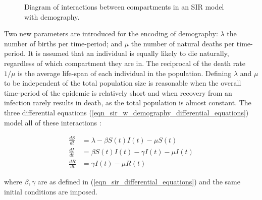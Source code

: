 \documentclass[11pt,a4paper]{article}
\theoremstyle{break}
\begin{document}
  \begin{figure}[H]
    \centering
    \caption{Diagram of interactions between compartments in an SIR model with demography.}
    \label{fig_sir_model_diagram_w_demography}
  \end{figure}

  \par Two new parameters are introduced for the encoding of demography: $\lambda$ the number of births per time-period; and $\mu$ the number of natural deaths per time-period. It is assumed that an individual is equally likely to die naturally, regardless of which compartment they are in. The reciprocal of the death rate $1/\mu$ is the average life-span of each individual in the population. Defining $\lambda$ and $\mu$ to be independent of the total population size is reasonable when the overall time-period of the epidemic is relatively short and when recovery from an infection rarely results in death, as the total population is almost constant. The three differential equations (\ref{eqn_sir_w_demography_differential_equations}) model all of these interactions \cite[]{application_of_sir_epidemiological_model}:

  \begin{subequations}\label{eqn_sir_w_demography_differential_equations}
    \begin{alignat}{2}
      \frac{dS}{dt}&=\lambda-\beta S(t)I(t)-\mu S(t)\label{eqn_sir_w_demography_dS_dt}\\
      \frac{dI}{dt}&=\beta S(t)I(t)-\gamma I(t)-\mu I(t)\\
      \frac{dR}{dt}&=\gamma I(t)-\mu R(t)
    \end{alignat}
  \end{subequations}

  where $\beta,\gamma$ are as defined in (\ref{eqn_sir_differential_equations}) and the same initial conditions are imposed.
\end{document}
